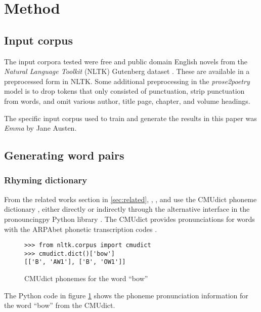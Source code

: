 \documentclass[11pt,a4paper]{article}
\begin{document}
\section{Method}
\label{sec:method}

\subsection{Input corpus}

The input corpora tested were free and public domain English novels from the \textit{Natural Language Toolkit} (NLTK) Gutenberg dataset \cite[Chapter~2]{gutenbergnltk}. These are available in a preprocessed form in NLTK. Some additional preprocessing in the \textit{prose2poetry} model is to drop tokens that only consisted of punctuation, strip punctuation from words, and omit various author, title page, chapter, and volume headings.

The specific input corpus used to train and generate the results in this paper was \textit{Emma} by Jane Austen.

\subsection{Generating word pairs}

\subsubsection{Rhyming dictionary}

From the related works section in \ref{sec:related}, \citet{keswarani}, \citet{cole}, and \citet{hopkins-kiela-2017} use the CMUdict phoneme dictionary \cite{cmudict}, either directly or indirectly through the alternative interface in the pronouncingpy Python library \cite{pronouncingpy}. The CMUdict provides pronunciations for words with the ARPAbet phonetic transcription codes \cite[Chapter~27]{jurafsky}.

\begin{figure}
\begin{Verbatim}[fontsize=\small]
>>> from nltk.corpus import cmudict
>>> cmudict.dict()['bow']
[['B', 'AW1'], ['B', 'OW1']]
\end{Verbatim}
\caption{CMUdict phonemes for the word ``bow''}
\label{fig:cmudict}
\end{figure}

The Python code in figure \ref{fig:cmudict} shows the phoneme pronunciation information for the word ``bow'' from the CMUdict.
\end{document}

